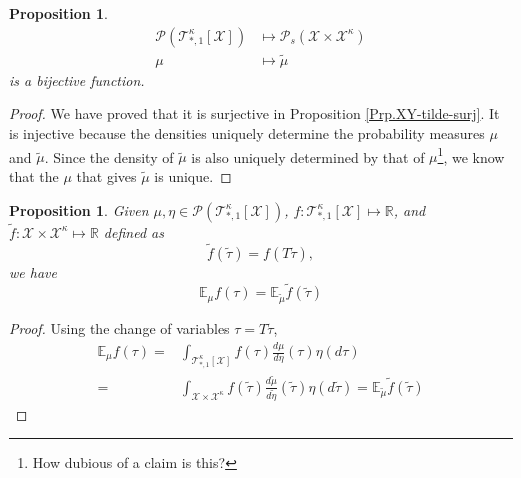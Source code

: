 \documentclass[12pt]{article}
\newtheorem{proposition}[theorem]{Proposition}
\numberwithin{equation}{section}
\begin{document}
\begin{proposition}
    \begin{align*}
        \mathcal{P}(\mathcal{T}^\kappa_{*, 1}[\mathcal{X}]) & \mapsto \mathcal{P}_s(\mathcal{X}\times\mathcal{X}^\kappa) \\
        \mu                                                 & \mapsto\widetilde{\mu}
    \end{align*}
    is a bijective function.
\end{proposition}

\begin{proof}
    We have proved that it is surjective in Proposition \ref{Prp.XY-tilde-surj}. It is injective because the densities uniquely determine
    the probability measures $\mu$ and $\widetilde{\mu}$. Since the density of $\widetilde{\mu}$ is also uniquely determined
    by that of $\mu$\footnote{How dubious of a claim is this?}, we know that the $\mu$ that gives $\widetilde{\mu}$ is unique.
\end{proof}

\begin{proposition}\label{Prp.XY-tilde-EXP-eq}
    Given $\mu, \eta \in \mathcal{P}(\mathcal{T}^\kappa_{*, 1}[\mathcal{X}])$,
    $f : \mathcal{T}^\kappa_{*, 1}[\mathcal{X}] \mapsto \mathbb{R}$, and
    $\widetilde{f} : \mathcal{X}\times\mathcal{X}^\kappa \mapsto \mathbb{R}$ defined as
    \begin{equation*}
        \widetilde{f}(\widetilde{\tau}) = f(T\widetilde{\tau}),
    \end{equation*}
    we have
    \begin{equation*}
        \mathbb{E}_\mu f(\tau) = \mathbb{E}_{\widetilde{\mu}} \widetilde{f}(\widetilde{\tau})
    \end{equation*}
\end{proposition}

\begin{proof}
    Using the change of variables $\tau = T\widetilde{\tau}$,
    \begin{align*}
        \mathbb{E}_\mu f(\tau) = & \int_{\mathcal{T}^\kappa_{*, 1}[\mathcal{X}]} f(\tau)\frac{d\mu}{d\eta}(\tau) \eta(d\tau)                                                                                                               \\
        =                        & \int_{\mathcal{X}\times\mathcal{X}^\kappa} f(\widetilde{\tau})\frac{d\widetilde\mu}{d\widetilde\eta}(\widetilde\tau) \eta(d\widetilde\tau) = \mathbb{E}_{\widetilde{\mu}} \widetilde{f}(\widetilde\tau)
    \end{align*}
\end{proof}
\end{document}
